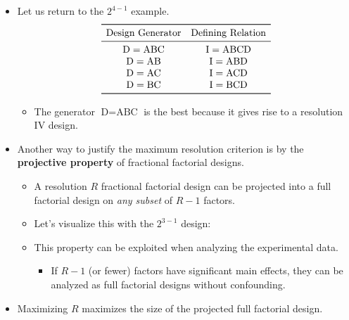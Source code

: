 \begin{itemize}
      \item Let us return to the $ 2^{4-1} $ example.
            \[ \begin{matrix}
                        \toprule
                        \text{Design Generator} & \text{Defining Relation} \\
                        \midrule
                        \text{D}=\text{ABC}     & \text{I}=\text{ABCD}     \\
                        \text{D}=\text{AB}      & \text{I}=\text{ABD}      \\
                        \text{D}=\text{AC}      & \text{I}=\text{ACD}      \\
                        \text{D}=\text{BC}      & \text{I}=\text{BCD}      \\
                        \bottomrule
                  \end{matrix} \]
            \begin{itemize}[*]
                  \item The generator $ \text{D}=\text{ABC} $ is the best because it gives rise to a resolution IV design.
            \end{itemize}
      \item Another way to justify the maximum resolution criterion is by the \textbf{projective property} of fractional
            factorial designs.
            \begin{itemize}[*]
                  \item A resolution $R$ fractional factorial design can be projected into a full factorial design on \emph{any subset}
                        of $R-1$ factors.
            \end{itemize}
            \begin{itemize}
                  \item Let's visualize this with the $ 2^{3-1} $ design:
                  \item This property can be exploited when analyzing the experimental data.
                        \begin{itemize}[$\hookrightarrow$]
                              \item If $ R-1 $ (or fewer) factors have significant main effects, they can be analyzed as full factorial
                                    designs without confounding.
                        \end{itemize}
            \end{itemize}
\end{itemize}
\begin{itemize}[*]
      \item Maximizing $R$ maximizes the size of the projected full factorial design.
\end{itemize}

